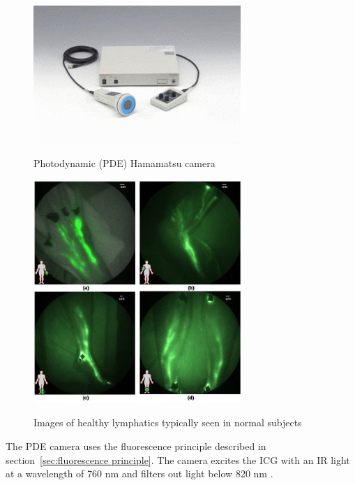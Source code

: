 \begin{figure}
\caption{Photodynamic (PDE) Hamamatsu camera}
\centering
    \includegraphics[width=0.7\textwidth]{images/hamamatsu.jpg}
\label{fig:hamamatsu}
\end{figure}

\begin{figure}
\caption{Images of healthy lymphatics typically seen in normal subjects}
\centering
    \includegraphics[width=0.7\textwidth]{images/imageICGLymph.png}
\label{fig:hamaResults0}
\end{figure}

The PDE camera uses the fluorescence principle described in section~\ref{sec:fluorescence principle}. The camera excites the ICG with an IR light at a wavelength of 760 nm \cite{tagaya_non-invasive_2010} and filters out light below 820 nm \cite{gotoh_novel_2009}. \\

